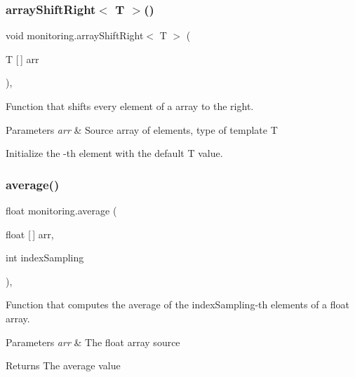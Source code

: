 \subsubsection{\texorpdfstring{array\+Shift\+Right$<$ T $>$()}{arrayShiftRight< T >()}}
{\footnotesize\ttfamily void monitoring.\+array\+Shift\+Right$<$ T $>$ (\begin{DoxyParamCaption}\item[{T \mbox{[}$\,$\mbox{]}}]{arr }\end{DoxyParamCaption})\hspace{0.3cm}{\ttfamily [inline]}, {\ttfamily [private]}}



Function that shifts every element of a array to the right. 


\begin{DoxyParams}{Parameters}
{\em arr} & Source array of elements, type of template {\ttfamily T}\\
\hline
\end{DoxyParams}


Initialize the {-\/th} element with the default {\ttfamily T} value.\mbox{\label{classmonitoring_a02b9ad38b7160a01547d1540d3ced5a2}} 
\subsubsection{\texorpdfstring{average()}{average()}\hspace{0.1cm}{\footnotesize\ttfamily [1/2]}}
{\footnotesize\ttfamily float monitoring.\+average (\begin{DoxyParamCaption}\item[{float \mbox{[}$\,$\mbox{]}}]{arr,  }\item[{int}]{index\+Sampling }\end{DoxyParamCaption})\hspace{0.3cm}{\ttfamily [inline]}, {\ttfamily [private]}}



Function that computes the average of the {\ttfamily index\+Sampling}-\/th elements of a float array. 


\begin{DoxyParams}{Parameters}
{\em arr} & The float array source\\
\hline
\end{DoxyParams}
\begin{DoxyReturn}{Returns}
The average value
\end{DoxyReturn}
\mbox{\label{classmonitoring_a8b3badd3272bcdef5a3f438db1dbde7f}} 

